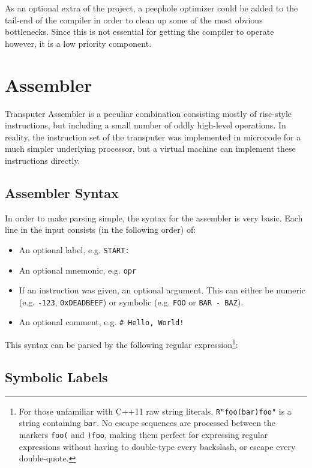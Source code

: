 As an optional extra of the project, a peephole optimizer could be added to the
tail-end of the compiler in order to clean up some of the most obvious
bottlenecks. Since this is not essential for getting the compiler to operate
however, it is a low priority component.

\section{Assembler}

Transputer Assembler is a peculiar combination consisting mostly of
\gls{risc}-style instructions, but including a small number of oddly high-level
operations. In reality, the instruction set of the transputer was implemented in
microcode for a much simpler underlying processor, but a virtual machine can
implement these instructions directly.

\subsection{Assembler Syntax}

In order to make parsing simple, the syntax for the assembler is very basic.
Each line in the input consists (in the following order) of:
\begin{itemize}
  \item An optional label, e.g. \texttt{START:}
  \item An optional \gls{mnemonic}, e.g. \texttt{opr}
  \item If an instruction was given, an optional argument. This can either be
        numeric (e.g. \texttt{-123}, \texttt{0xDEADBEEF}) or symbolic
        (e.g. \texttt{FOO} or \texttt{BAR - BAZ}).
  \item An optional comment, e.g. \texttt{\# Hello, World!}
\end{itemize}

This syntax can be parsed by the following regular expression\footnote{For those
unfamiliar with C++11 raw string literals, \texttt{R"foo(bar)foo"} is a string
containing \texttt{bar}. No escape sequences are processed between the markers
\texttt{foo(} and \texttt{)foo}, making them perfect for expressing regular
expressions without having to double-type every backslash, or escape every
double-quote.}:


\subsection{Symbolic Labels}

